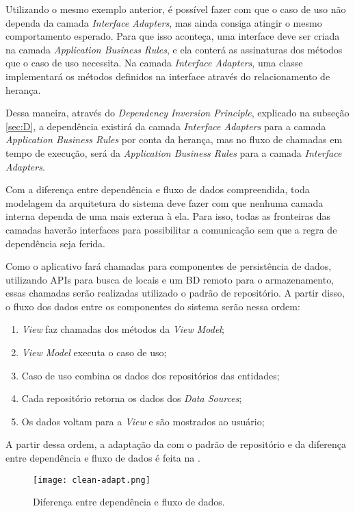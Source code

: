 Utilizando o mesmo exemplo anterior, é possível fazer com que o caso de uso não dependa da camada \textit{Interface Adapters}, mas ainda consiga atingir o mesmo comportamento esperado. Para que isso aconteça, uma interface deve ser criada na camada \textit{Application Business Rules}, e ela conterá as assinaturas dos métodos que o caso de uso necessita. Na camada \textit{Interface Adapters}, uma classe implementará os métodos definidos na interface através do relacionamento de herança.

Dessa maneira, através do \textit{Dependency Inversion Principle}, explicado na subseção \ref{sec:D}, a dependência existirá da camada \textit{Interface Adapters} para a camada \textit{Application Business Rules} por conta da herança, mas no fluxo de chamadas em tempo de execução, será da \textit{Application Business Rules} para a camada \textit{Interface Adapters}.

Com a diferença entre dependência e fluxo de dados compreendida, toda modelagem da arquitetura do sistema deve fazer com que nenhuma camada interna dependa de uma mais externa à ela. Para isso, todas as fronteiras das camadas haverão interfaces para possibilitar a comunicação sem que a regra de dependência seja ferida.

Como o aplicativo fará chamadas para componentes de persistência de dados, utilizando APIs para busca de locais e um BD remoto para o armazenamento, essas chamadas serão realizadas utilizado o padrão de repositório. A partir disso, o fluxo dos dados entre os componentes do sistema serão nessa ordem:

\begin{enumerate}
  \item \textit{View} faz chamadas dos métodos da \textit{View Model};
  \item \textit{View Model} executa o caso de uso;
  \item Caso de uso combina os dados dos repositórios das entidades;
  \item Cada repositório retorna os dados dos \textit{Data Sources};
  \item Os dados voltam para a \textit{View} e são mostrados ao usuário;
\end{enumerate}

A partir dessa ordem, a adaptação da  com o padrão de repositório e da diferença entre dependência e fluxo de dados é feita na .

\begin{figure}[!htb]
  \centering
  \texttt{[image: clean-adapt.png]}
  \caption{Diferença entre dependência e fluxo de dados.}
  \label{fig:cleanadapt}
\end{figure}

